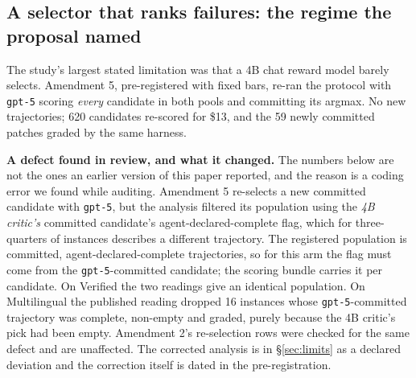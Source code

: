 \documentclass[11pt]{article}
\begin{document}
\subsection{A selector that ranks failures: the regime the proposal named}\label{sec:selector}
The study's largest stated limitation was that a 4B chat reward model barely selects. Amendment 5, pre-registered with fixed bars, re-ran the protocol with \texttt{gpt-5} scoring \emph{every} candidate in both pools and committing its argmax. No new trajectories; 620 candidates re-scored for \$13, and the 59 newly committed patches graded by the same harness.

\textbf{A defect found in review, and what it changed.} The numbers below are not the ones an earlier version of this paper reported, and the reason is a coding error we found while auditing. Amendment 5 re-selects a new committed candidate with \texttt{gpt-5}, but the analysis filtered its population using the \emph{4B critic's} committed candidate's agent-declared-complete flag, which for three-quarters of instances describes a different trajectory. The registered population is committed, agent-declared-complete trajectories, so for this arm the flag must come from the \texttt{gpt-5}-committed candidate; the scoring bundle carries it per candidate. On Verified the two readings give an identical population. On Multilingual the published reading dropped 16 instances whose \texttt{gpt-5}-committed trajectory was complete, non-empty and graded, purely because the 4B critic's pick had been empty. Amendment 2's re-selection rows were checked for the same defect and are unaffected. The corrected analysis is in \S\ref{sec:limits} as a declared deviation and the correction itself is dated in the pre-registration.
\end{document}
